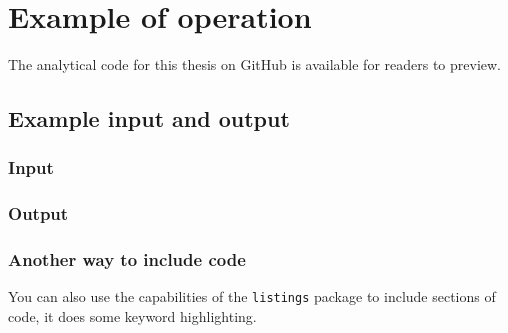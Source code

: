 \chapter{Example of operation}

The analytical code for this thesis on GitHub is available for readers to preview.

\section{Example input and output}
\label{sec:inp-eg}
\subsection{Input}
\label{sec:input}
{\fontsize{6pt}{6pt}\selectfont 

}

\subsection{Output}
\label{sec:output}


\subsection{Another way to include code}
You can also use the capabilities of the \texttt{listings} package to
include sections of code, it does some keyword highlighting.




